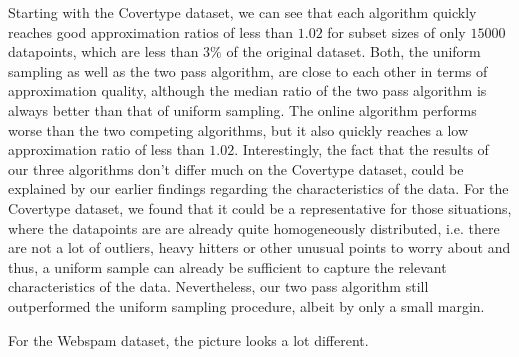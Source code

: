 Starting with the Covertype dataset, we can see that each algorithm
quickly reaches good approximation ratios of less than $1.02$
for subset sizes of only $15000$ datapoints, which are less than
$3\%$ of the original dataset.
Both, the uniform sampling as well as the two pass algorithm, are
close to each other in terms of approximation quality, although
the median ratio of the two pass algorithm is always better than
that of uniform sampling. The online algorithm performs worse than
the two competing algorithms, but it also quickly reaches a low
approximation ratio of less than $1.02$.
Interestingly, the fact that the results of our three algorithms
don't differ much on the Covertype dataset, could
be explained by our earlier
findings regarding the characteristics of the data.
For the Covertype dataset, we found that it could be a representative for
those situations, where the datapoints are are already
quite homogeneously distributed, i.e. there
are not a lot of outliers, heavy hitters or other unusual points to worry
about and thus, a uniform sample can already be sufficient to
capture the relevant characteristics of the data.
Nevertheless, our two pass algorithm still outperformed the uniform
sampling procedure, albeit by only a small margin.

For the Webspam dataset, the picture looks a lot different.
